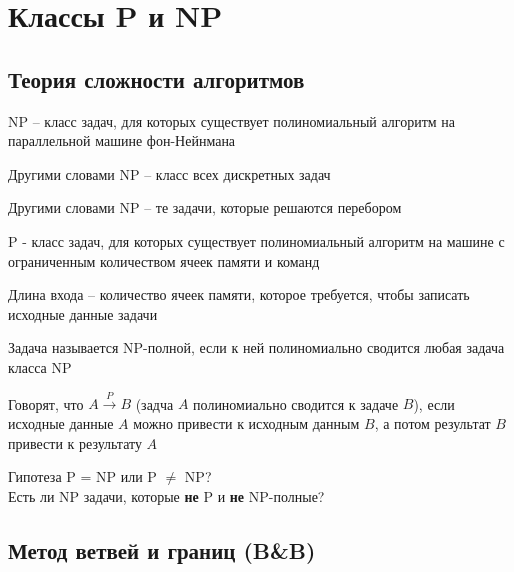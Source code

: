 \chapter{Классы P и NP}

\section{Теория сложности алгоритмов}

\begin{definition}
	NP -- класс задач, для которых существует полиномиальный алгоритм на параллельной машине фон-Нейнмана
\end{definition}

\begin{undefthm}{Другими словами}
	NP -- класс всех дискретных задач
\end{undefthm}

\begin{undefthm}{Другими словами}
	NP -- те задачи, которые решаются перебором
\end{undefthm}

\begin{definition}
	P - класс задач, для которых существует полиномиальный алгоритм на машине с ограниченным количеством ячеек памяти и команд
\end{definition}

\begin{definition}
	Длина входа -- количество ячеек памяти, которое требуется, чтобы записать исходные данные задачи
\end{definition}

\begin{definition}
	Задача называется NP-полной, если к ней полиномиально сводится любая задача класса NP
\end{definition}

\begin{definition}
    Говорят, что $ A \xrightarrow{P} B $ (задча $ A $ полиномиально сводится к задаче $ B $), если исходные данные $ A $ можно привести к исходным данным $ B $, а потом результат $ B $ привести к результату $ A $
\end{definition}

\begin{undefthm}{Гипотеза}
	P = NP или P $ \ne $ NP? \\
    Есть ли NP задачи, которые \textbf{не} P и \textbf{не} NP-полные?
\end{undefthm}

\section{Метод ветвей и границ (B\&B)}

